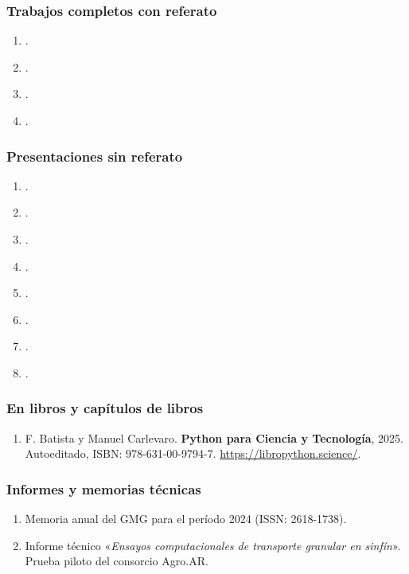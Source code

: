 \documentclass[a4paper,11pt,twoside,final,titlepage,onecolumn,openright]{report}
\begin{document}
\subsubsection{Trabajos completos con referato}
\begin{enumerate}
	\item {}.
	\item {}.
	\item {}.
	\item {}.
\end{enumerate}

\subsubsection{Presentaciones sin referato}

\begin{enumerate}
	\item {}.
	\item {}.
	\item {}.
	\item {}.
	\item {}.
	\item {}.
	\item {}.
	\item {}.
\end{enumerate}

\subsubsection{En libros y capítulos de libros}

\begin{enumerate}
	\item F. Batista y Manuel Carlevaro. \textbf{Python para Ciencia y Tecnología}, 2025. Autoeditado, ISBN:  978-631-00-9794-7. \url{https://libropython.science/}.
\end{enumerate}

\subsubsection{Informes y memorias técnicas}
\begin{enumerate}
	\item Memoria anual del GMG para el período 2024 (ISSN: 2618-1738).
  \item Informe técnico «\textit{Ensayos computacionales de transporte granular en sinfín}». Prueba piloto del consorcio Agro.AR.
\end{enumerate}
\vspace{0.25cm}
\end{document}
